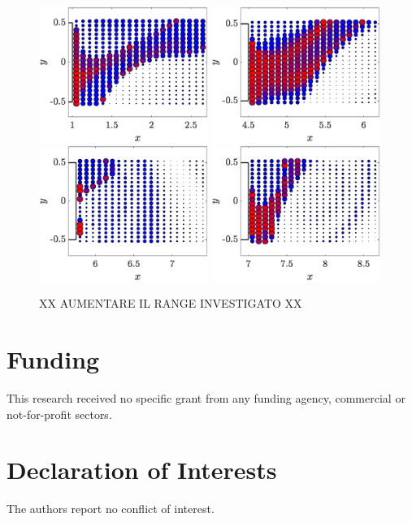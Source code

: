 \documentclass{jfm}
\begin{document}
\begin{figure}
  \centering
  \includegraphics[width=0.49\textwidth]{./fig/LagTrac/part_AR1_Re200.eps}
  \includegraphics[width=0.49\textwidth]{./fig/LagTrac/part_AR4p5_Re410.eps}
  \includegraphics[width=0.49\textwidth]{./fig/LagTrac/part_AR5p75_Re550.eps}
  \includegraphics[width=0.49\textwidth]{./fig/LagTrac/part_AR7_Re500.eps}  
  \caption{XX AUMENTARE IL RANGE INVESTIGATO XX}
  \label{fig:part_res}
\end{figure}    

\section*{Funding} 
This research received no specific grant from any funding agency, commercial or not-for-profit sectors.

\section*{Declaration of Interests} 
The authors report no conflict of interest.




\end{document}
